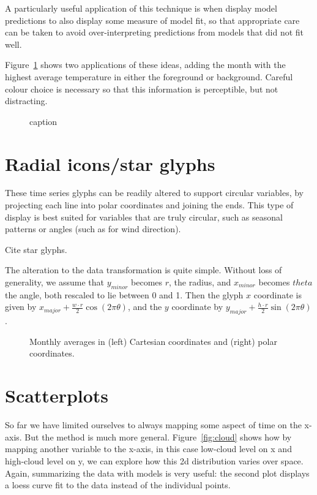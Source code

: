 \documentclass[oneside]{article}
\begin{document}
A particularly useful application of this technique is when display model predictions to also display some measure of model fit, so that appropriate care can be taken to avoid over-interpreting predictions from models that did not fit well.

Figure~\ref{fig:ref-adv} shows two applications of these ideas, adding the month with the highest average temperature in either the foreground or background. Careful colour choice is necessary so that this information is perceptible, but not distracting.

\begin{figure}[htbp]
  \centering
  \caption{caption}
  \label{fig:ref-adv}
\end{figure}


\section{Radial icons/star glyphs}

These time series glyphs can be readily altered to support circular variables, by projecting each line into polar coordinates and joining the ends. This type of display is best suited for variables that are truly circular, such as seasonal patterns or angles (such as for wind direction).

Cite star glyphs.

The alteration to the data transformation is quite simple. Without loss of generality, we assume that $y_{minor}$ becomes $r$, the radius, and $x_{minor}$ becomes $theta$ the angle, both rescaled to lie between 0 and 1. Then the glyph $x$ coordinate is given by $x_{major} + \frac{w \cdot r}{2} \cos(2 \pi \theta)$, and the $y$ coordinate by $y_{major} + \frac{h \cdot r}{2} \sin(2 \pi \theta)$.

\begin{figure}[htbp]
  \centering
    
  \caption{Monthly averages in (left) Cartesian coordinates and (right) polar coordinates.}
  
  \label{fig:cycle}
\end{figure}

\section{Scatterplots}

So far we have limited ourselves to always mapping some aspect of time on the x-axis. But the method is much more general. Figure~\ref{fig:cloud} shows how by mapping another variable to the x-axis, in this case low-cloud level on x and high-cloud level on y, we can explore how this 2d distribution varies over space. Again, summarizing the data with models is very useful: the second plot displays a loess curve fit to the data instead of the individual points.  
\end{document}
